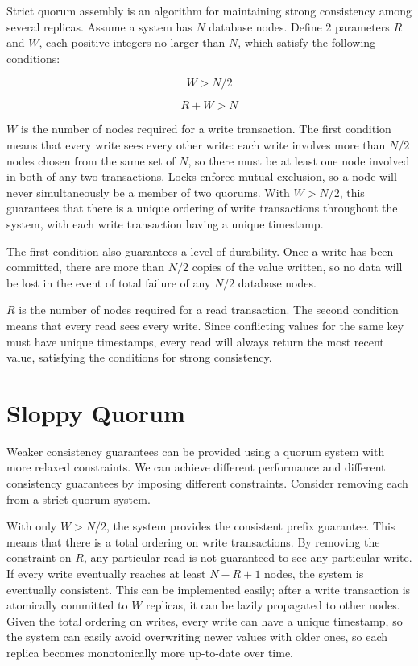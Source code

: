 \documentclass[12pt,a4paper,twoside,openany]{report}
\begin{document}
Strict quorum assembly is an algorithm for maintaining strong consistency among several replicas. Assume a system has $N$ database nodes. Define 2 parameters $R$ and $W$, each positive integers no larger than $N$, which satisfy the following conditions:

$$W > N / 2$$

$$R + W > N$$

$W$ is the number of nodes required for a write transaction. The first condition means that every write sees every other write: each write involves more than $N/2$ nodes chosen from the same set of $N$, so there must be at least one node involved in both of any two transactions. Locks enforce mutual exclusion, so a node will never simultaneously be a member of two quorums. With $W > N/2$, this guarantees that there is a unique ordering of write transactions throughout the system, with each write transaction having a unique timestamp.

The first condition also guarantees a level of durability. Once a write has been committed, there are more than $N/2$ copies of the value written, so no data will be lost in the event of total failure of any $N/2$ database nodes.

$R$ is the number of nodes required for a read transaction. The second condition means that every read sees every write. Since conflicting values for the same key must have unique timestamps, every read will always return the most recent value, satisfying the conditions for strong consistency.

\section{Sloppy Quorum}

Weaker consistency guarantees can be provided using a quorum system with more relaxed constraints. We can achieve different performance and different consistency guarantees by imposing different constraints. Consider removing each from a strict quorum system.

With only $W > N/2$, the system provides the consistent prefix guarantee. This means that there is a total ordering on write transactions. By removing the constraint on $R$, any particular read is not guaranteed to see any particular write. If every write eventually reaches at least $N - R + 1$ nodes, the system is eventually consistent. This can be implemented easily; after a write transaction is atomically committed to $W$ replicas, it can be lazily propagated to other nodes. Given the total ordering on writes, every write can have a unique timestamp, so the system can easily avoid overwriting newer values with older ones, so each replica becomes monotonically more up-to-date over time.
\end{document}
